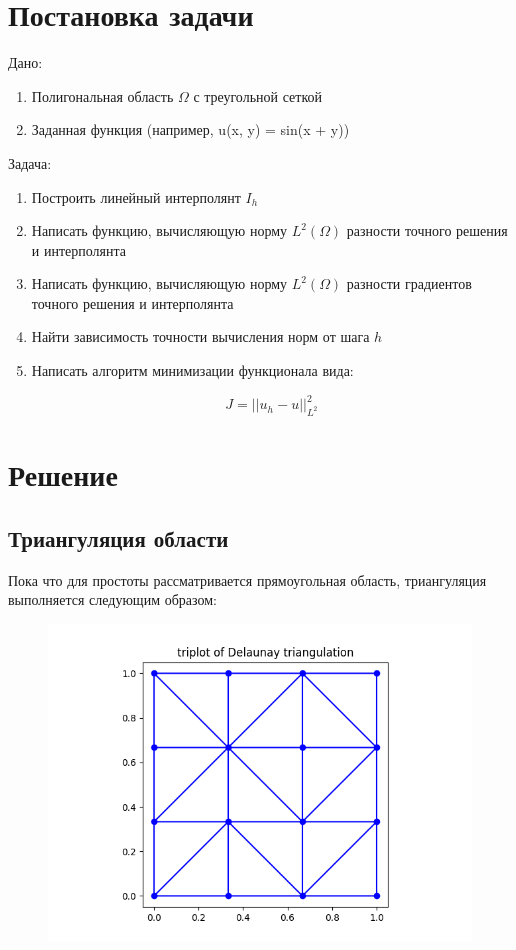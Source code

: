 \documentclass[12pt]{article}
\begin{document}
\section{Постановка задачи}

\quad  Дано:
\begin{enumerate}
\item Полигональная область $\Omega$ с треугольной сеткой
\item Заданная функция (например, u(x, y) = sin(x + y))
\end{enumerate} 

Задача:

\begin{enumerate}
\item Построить линейный интерполянт $I_h$
\item Написать функцию, вычисляющую норму $L^2(\Omega)$ разности точного решения и интерполянта
\item Написать функцию, вычисляющую норму $L^2(\Omega)$ разности градиентов точного решения и интерполянта 
\item Найти зависимость точности вычисления норм от шага $h$
\item Написать алгоритм минимизации функционала вида:

\begin{equation}
J = ||u_h - u||_{L^2}^2
\end{equation}

\end{enumerate} 

\section{Решение}
\subsection{Триангуляция области}
Пока что для простоты рассматривается прямоугольная область, триангуляция выполняется следующим образом:

\begin{figure}[H] \label{fig1}
\centerline{\includegraphics[scale = 0.8]{Figure_1.png}}
\end{figure} 
\end{document}
